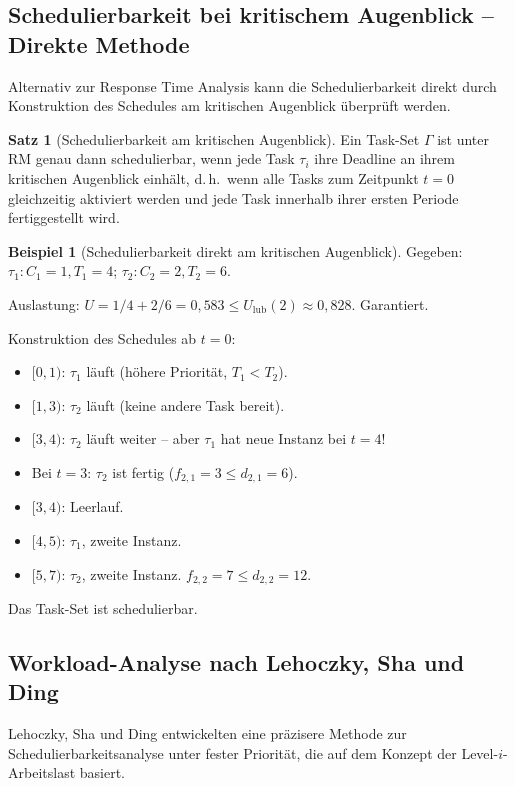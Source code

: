 ﻿\documentclass[a4paper,12pt]{report}
\theoremstyle{definition}
\newtheorem{beispiel}{Beispiel}[chapter]
\newtheorem{satz}{Satz}[chapter]
\begin{document}
\subsection{Schedulierbarkeit bei kritischem Augenblick -- Direkte Methode}

Alternativ zur Response Time Analysis kann die Schedulierbarkeit direkt durch
Konstruktion des Schedules am kritischen Augenblick überprüft werden.

\begin{satz}[Schedulierbarkeit am kritischen Augenblick]
	Ein Task-Set $\Gamma$ ist unter RM genau dann schedulierbar, wenn jede Task
	$\tau_i$ ihre Deadline an ihrem kritischen Augenblick einhält, d.\,h.\ wenn alle
	Tasks zum Zeitpunkt $t = 0$ gleichzeitig aktiviert werden und jede Task innerhalb
	ihrer ersten Periode fertiggestellt wird.
\end{satz}

\begin{beispiel}[Schedulierbarkeit direkt am kritischen Augenblick]
	Gegeben: $\tau_1: C_1=1, T_1=4$; $\tau_2: C_2=2, T_2=6$.

	Auslastung: $U = 1/4 + 2/6 = 0{,}583 \leq U_{\text{lub}}(2) \approx 0{,}828$. Garantiert.

	Konstruktion des Schedules ab $t=0$:
	\begin{itemize}
		\item $[0,1)$: $\tau_1$ läuft (höhere Priorität, $T_1 < T_2$).
		\item $[1,3)$: $\tau_2$ läuft (keine andere Task bereit).
		\item $[3,4)$: $\tau_2$ läuft weiter -- aber $\tau_1$ hat neue Instanz bei $t=4$!
		\item Bei $t=3$: $\tau_2$ ist fertig ($f_{2,1}=3 \leq d_{2,1}=6$). \checkmark
		\item $[3,4)$: Leerlauf.
		\item $[4,5)$: $\tau_1$, zweite Instanz.
		\item $[5,7)$: $\tau_2$, zweite Instanz. $f_{2,2} = 7 \leq d_{2,2} = 12$. \checkmark
	\end{itemize}
	Das Task-Set ist schedulierbar.
\end{beispiel}

\subsection{Workload-Analyse nach Lehoczky, Sha und Ding}

Lehoczky, Sha und Ding \cite{Lehoczky1989} entwickelten eine präzisere Methode
zur Schedulierbarkeitsanalyse unter fester Priorität, die auf dem Konzept der
Level-$i$-Arbeitslast basiert.
\end{document}
